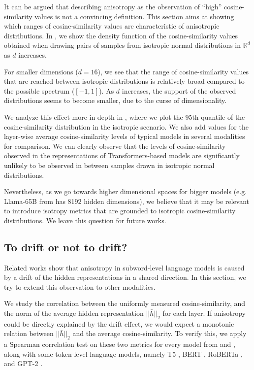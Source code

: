 It can be argued that describing anisotropy as the observation of ``high'' cosine-similarity values is not a convincing definition. This section aims at showing which ranges of cosine-similarity values are characteristic of anisotropic distributions. 
In , we show the density function of the cosine-similarity values obtained when drawing pairs of samples from isotropic normal distributions in $\mathbb{R}^d$ as $d$ increases. 

For smaller dimensions ($d=16$), we see that the range of cosine-similarity values that are reached between isotropic distributions is relatively broad compared to the possible spectrum ($[-1, 1]$). As $d$ increases, the support of the observed distributions seems to become smaller, due to the curse of dimensionality.

We analyze this effect more in-depth in , where we plot the 95th quantile of the cosine-similarity distribution in the isotropic scenario. We also add values for the layer-wise average cosine-similarity levels of typical models in several modalities for comparison. We can clearly observe that the levels of cosine-similarity observed in the representations of Transformers-based models are significantly unlikely to be observed in between samples drawn in isotropic normal distributions.

Nevertheless, as we go towards higher dimensional spaces for bigger models (e.g. Llama-65B from \citet{touvron2023llama} has 8192 hidden dimensions), we believe that it may be relevant to introduce isotropy metrics that are grounded to isotropic cosine-similarity distributions. We leave this question for future works.

\subsection{To drift or not to drift?}
Related works \citep{bis-etal-2021-much, gao2018representation} show that anisotropy in subword-level language models is caused by a drift of the hidden representations in a shared direction. In this section, we try to extend this observation to other modalities.

We study the correlation between the uniformly measured cosine-similarity, and the norm of the average hidden representation $||\bar{h}||_2$ for each layer. If anisotropy could be directly explained by the drift effect, we would expect a monotonic relation between $||\bar{h}||_2$ and the average cosine-similarity. To verify this, we apply a Spearman correlation test on these two metrics for every model from  and , along with some token-level language models, namely T5 \citep{2020t5}, BERT \citep{devlin-etal-2019-bert}, RoBERTa \citep{roberta}, and GPT-2 \citep{gpt2}.

